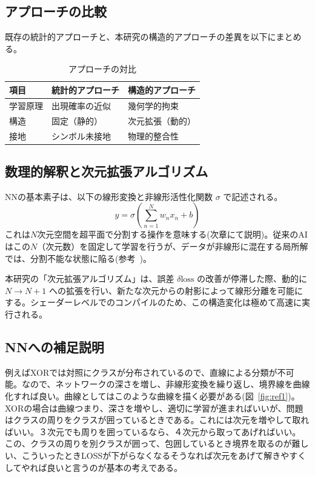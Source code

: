 \documentclass[a4j, twocolumn]{article}
\begin{document}
\subsection{アプローチの比較}
既存の統計的アプローチと、本研究の構造的アプローチの差異を以下にまとめる。

\begin{table}[h]
\centering
\caption{アプローチの対比}
\begin{tabular}{l|l|l}
\hline %
項目 & 統計的アプローチ & 構造的アプローチ \\ \hline %
学習原理 & 出現確率の近似 & 幾何学的拘束 \\
構造 & 固定（静的） & 次元拡張（動的） \\
接地 & シンボル未接地 & 物理的整合性 \\ \hline %
\end{tabular}
\end{table}

\subsection{数理的解釈と次元拡張アルゴリズム}
NNの基本素子は、以下の線形変換と非線形活性化関数 $\sigma$ で記述される。
\begin{equation}
    y = \sigma\left(\sum_{n=1}^N w_n x_n + b\right)
\end{equation}
これは$N$次元空間を超平面で分割する操作を意味する(次章にて説明)。従来のAIはこの$N$（次元数）を固定して学習を行うが、データが非線形に混在する局所解では、分割不能な状態に陥る(参考~\cite{ref2})。

本研究の「次元拡張アルゴリズム」は、誤差 $\delta \text{loss}$ の改善が停滞した際、動的に $N \to N+1$ への拡張を行い、新たな次元からの射影によって線形分離を可能にする。シェーダーレベルでのコンパイルのため、この構造変化は極めて高速に実行される。

\subsection{NNへの補足説明}
例えばXORでは対照にクラスが分布されているので、直線による分類が不可能。なので、ネットワークの深さを増し、非線形変換を繰り返し、境界線を曲線化すれば良い。曲線としてはこのような曲線を描く必要がある(図~\ref{fig:ref1})。
XORの場合は曲線つまり、深さを増やし、適切に学習が進まればいいが、問題はクラスの周りをクラスが囲っているときである。これには次元を増やして取ればいい。３次元でも周りを囲っているなら、４次元から取ってあげればいい。
この、クラスの周りを別クラスが囲って、包囲しているとき境界を取るのが難しい、こういったときLOSSが下がらなくなるそうなれば次元をあげて解きやすくしてやれば良いと言うのが基本の考えである。
\end{document}
